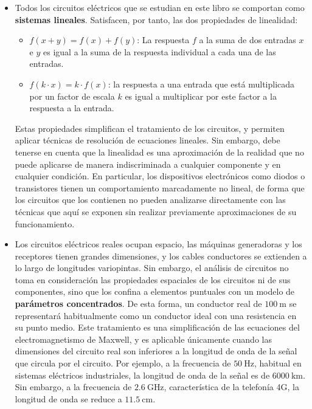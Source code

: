 \begin{itemize}
\item Todos los circuitos eléctricos que se estudian en este libro se comportan como \textbf{sistemas lineales}. Satisfacen, por tanto, las dos propiedades de linealidad:
  \begin{itemize}
  \item $f(x + y) = f(x) + f(y)$: La respuesta $f$ a la suma de dos entradas $x$ e $y$ es igual a la suma de la respuesta individual a cada una de las entradas.
  \item $f(k \cdot x) = k \cdot f(x)$: la respuesta a una entrada que está multiplicada por un factor de escala $k$ es igual a multiplicar por este factor a la respuesta a la entrada.
  \end{itemize}
  Estas propiedades simplifican el tratamiento de los circuitos, y permiten aplicar técnicas de resolución de ecuaciones lineales. Sin embargo, debe tenerse en cuenta que la linealidad es una aproximación de la realidad que no puede aplicarse de manera indiscriminada a cualquier componente y en cualquier condición. En particular, los dispositivos electrónicos como diodos o transistores tienen un comportamiento marcadamente no lineal, de forma que los circuitos que los contienen no pueden analizarse directamente con las técnicas que aquí se exponen sin realizar previamente aproximaciones de su funcionamiento.
\item Los circuitos eléctricos reales ocupan espacio, las máquinas generadoras y los receptores tienen grandes dimensiones, y los cables conductores se extienden a lo largo de longitudes variopintas. Sin embargo, el análisis de circuitos no toma en consideración las propiedades espaciales de los circuitos ni de sus componentes, sino que los confina a elementos puntuales con un modelo de \textbf{parámetros concentrados}. De esta forma, un conductor real de $\SI{100}{\meter}$ se representará habitualmente como un conductor ideal con una resistencia en su punto medio. Este tratamiento es una simplificación de las ecuaciones del electromagnetismo de Maxwell, y es aplicable únicamente cuando las dimensiones del circuito real son inferiores a la longitud de onda de la señal que circula por el circuito. Por ejemplo, a la frecuencia de $\SI{50}{\hertz}$, habitual en sistemas eléctricos industriales, la longitud de onda de la señal es de $\SI{6000}{\kilo\meter}$. Sin embargo, a la frecuencia de $\SI{2.6}{\giga\hertz}$, característica de la telefonía 4G, la longitud de onda se reduce a $\SI{11.5}{\centi\meter}$. 
\end{itemize}

